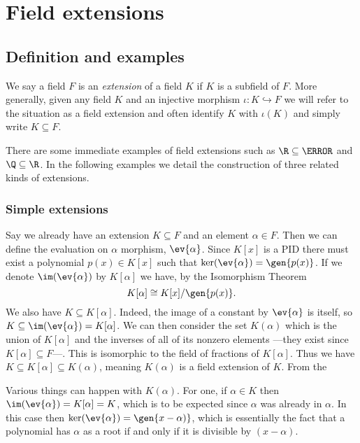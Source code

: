 \documentclass[12pt,oneside]{book}
\begin{document}
\begin{example}
\begin{points}
	\end{points}
\end{example}

\chapter{Field extensions}
\section{Definition and examples}
\begin{definition}
	We say a field \( F \) is an \emph{extension} of a field \( K \) if \( K \) is a
	subfield of \( F \). More generally, given any field \( K \) and an injective morphism
	\( 	\iota \colon K \hookrightarrow F \) we will refer to the situation as a field
	extension and often identify \( K \) with \( \iota(K) \) and simply write \( K \subseteq F \). 
\end{definition}

There are some immediate examples of field extensions such as \( \R \subseteq \C \) and \(
\Q \subseteq \R \). In the following examples we detail the construction of three related
kinds of extensions.

\subsection{Simple extensions}
Say we already have an extension \( K \subseteq F \) and an element \( \alpha \in F \).
Then we can define the evaluation on \( \alpha \) morphism, \( \ev{\alpha} \). Since \(
K[x] \) is a PID there must exist a polynomial \( p(x) \in K[x] \) such that \(
\ker(\ev{\alpha}) = \gen{p(x)} \). If we denote \( \im(\ev{\alpha}) \) by \( K[\alpha] \)
we have, by the Isomorphism Theorem
\begin{equation*}
	K[\alpha] \cong K[x]/\gen{p(x)}.
\end{equation*}
We also have \( K \subseteq K[\alpha] \). Indeed, the image of a constant by \(
\ev{\alpha} \) is itself, so \( K \subseteq \im(\ev{\alpha}) = K[\alpha] \). We can then
consider the set \( K(\alpha) \) which is the union of \( K[\alpha] \) and the inverses of
all of its nonzero elements ---they exist since \( K[\alpha] \subseteq F \)---. This is
isomorphic to the field of fractions of \( K[\alpha] \). Thus we have \( K \subseteq K[\alpha]
\subseteq K(\alpha) \), meaning \( K(\alpha) \) is a field extension of \( K \). From the

Various things can happen with \( K(\alpha) \). For one, if \( \alpha \in K \)
then \( \im(\ev{\alpha}) = K[\alpha] = K \), which is to be expected since \( \alpha \)
was already in \( \alpha \). In this case then \( \ker(\ev{\alpha}) = \gen{x - \alpha)}
\), which is essentially the fact that a polynomial has \( \alpha \) as a root if and only
if it is divisible by \( (x - \alpha) \).
\end{document}

